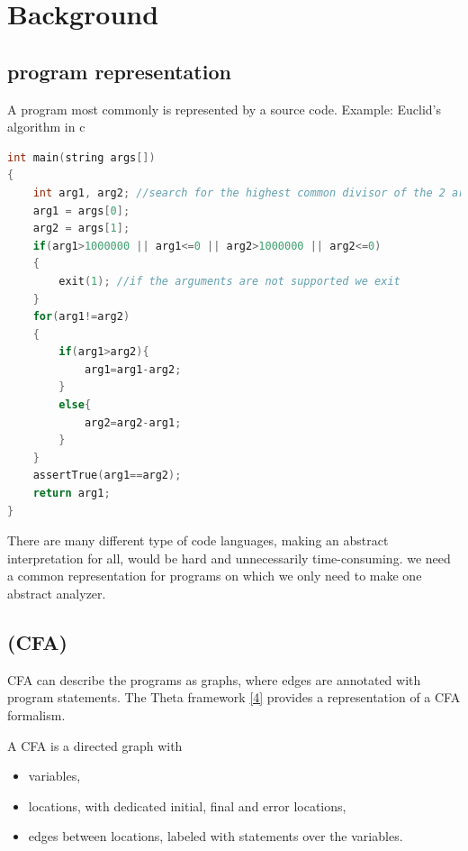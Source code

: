 \chapter{Background}
\label{sec:cfa}


\section{program representation}
\label{sec:program}

A program most commonly is represented by a source code. Example: Euclid's algorithm in c

\begin{lstlisting}[language=C,breaklines=true]
int main(string args[])
{
	int arg1, arg2; //search for the highest common divisor of the 2 argument
	arg1 = args[0];
	arg2 = args[1];
	if(arg1>1000000 || arg1<=0 || arg2>1000000 || arg2<=0)
	{
		exit(1); //if the arguments are not supported we exit
	}
	for(arg1!=arg2)
	{ 
		if(arg1>arg2){
			arg1=arg1-arg2;
		}
		else{
			arg2=arg2-arg1;
		}
	}
	assertTrue(arg1==arg2);
	return arg1;	
}
\end{lstlisting}

There are many different type of code languages, making an abstract interpretation for all, would be hard and unnecessarily time-consuming. we need a common representation for programs on which we only need to make one abstract analyzer.

\section{\cfa (CFA)}
\label{sec:cfaleiras}
CFA can describe the programs as graphs, where edges are annotated with program statements. The Theta framework \hyperref[sec:ref]{[4]} provides a representation of a CFA formalism.

A CFA is a directed graph with
 
\begin{itemize}
	\item variables,
	\item locations, with dedicated initial, final and error locations,
	\item edges between locations, labeled with statements over the variables.
\end{itemize}


